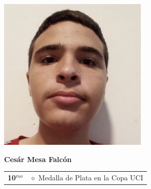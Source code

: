\vspace*{0.2in}

\begin{minipage}{0.2\textwidth}
	\includegraphics[width=\linewidth]{img/concursantes/cesar_mesa.png} %
\end{minipage}
\hfill
\begin{minipage}{0.7\textwidth}
	\textbf{Cesár Mesa Falcón}
	
	\vspace*{0.1in}
	\begin{tabular}{rl}
		
		
		
		\textbf{10$^{mo}$} 
		& $\diamond$ Medalla de Plata en la Copa UCI \\
		
		
		
	\end{tabular}
\end{minipage}

\vspace*{0.2in}

